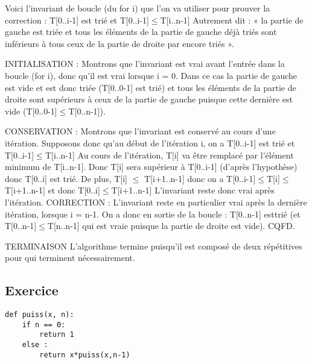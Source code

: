 \ifprof
Voici l’invariant de boucle (du for i) que l’on va utiliser pour prouver la correction :
T[0..i-1] est trié et T[0..i-1]$\leq$T[i..n-1]
Autrement dit : « la partie de gauche est triée et tous les éléments de la partie de
gauche déjà triés sont inférieurs à tous ceux de la partie de droite par encore triés ».

INITIALISATION : Montrons que l’invariant est vrai avant l’entrée dans la boucle (for
i), donc qu’il est vrai lorsque i = 0. Dans ce cas la partie de gauche est vide et est donc
triée (T[0..0-1] est trié) et tous les éléments de la partie de droite sont supérieurs à ceux
de la partie de gauche puisque cette dernière est vide (T[0..0-1]$\leq$T[0..n-1]).

CONSERVATION : Montrons que l’invariant est conservé au cours d’une itération.
Supposons donc qu’au début de l’itération i, on a T[0..i-1] est trié et T[0..i-1]$\leq$T[i..n-1]
Au cours de l’itération, T[i] va être remplacé par l’élément minimum de T[i..n-1]. Donc
T[i] sera supérieur à T[0..i-1] (d’après l’hypothèse) donc T[0..i] est trié. De plus, T[i] $\leq$
T[i+1..n-1] donc on a T[0..i-1]$\leq$T[i]$\leq$T[i+1..n-1] et donc T[0..i]$\leq$T[i+1..n-1]
L’invariant reste donc vrai après l’itération.
CORRECTION : L’invariant reste en particulier vrai après la dernière itération, lorsque i
= n-1. On a donc en sortie de la boucle : T[0..n-1] esttrié (et T[0..n-1]$\leq$T[n..n-1] qui
est vraie puisque la partie de droite est vide). CQFD.

TERMINAISON 
L’algorithme termine puisqu’il est composé de deux répétitives pour qui terminent
nécessairement.

\else
\fi


\subsection*{Exercice}


\begin{lstlisting}
def puiss(x, n):
    if n == 0:
        return 1
    else :
        return x*puiss(x,n-1)
\end{lstlisting}



